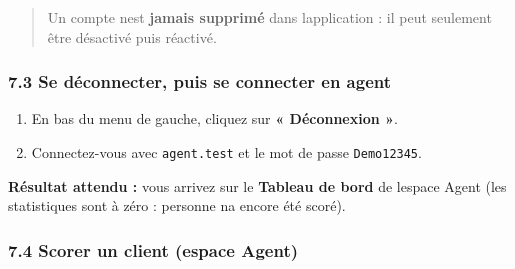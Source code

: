 \documentclass[
  french,
  11pt,
  a4paper,
]{article}
\providecommand{\tightlist}{%
  \setlength{\itemsep}{0pt}\setlength{\parskip}{0pt}}
\begin{document}
\begin{quote}
Un compte n\textquotesingle est \textbf{jamais supprimé} dans
l\textquotesingle application : il peut seulement être désactivé puis
réactivé.
\end{quote}

\subsubsection{7.3 Se déconnecter, puis se connecter en
agent}\label{73-se-duxe9connecter-puis-se-connecter-en-agent}

\begin{enumerate}
\def\labelenumi{\arabic{enumi}.}
\tightlist
\item
  En bas du menu de gauche, cliquez sur \textbf{« Déconnexion »}.
\item
  Connectez-vous avec \texttt{agent.test} et le mot de passe
  \texttt{Demo12345}.
\end{enumerate}

\textbf{Résultat attendu :} vous arrivez sur le \textbf{Tableau de bord}
de l\textquotesingle espace Agent (les statistiques sont à zéro :
personne n\textquotesingle a encore été scoré).

\subsubsection{7.4 Scorer un client (espace
Agent)}\label{74-scorer-un-client-espace-agent}
\end{document}
